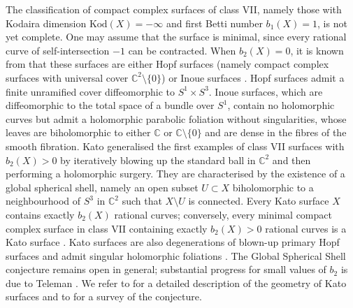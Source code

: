 \documentclass[12pt]{amsart}
\numberwithin{equation}{section}
\theoremstyle{remark}
\theoremstyle{definition}
\begin{document}
The classification of compact complex surfaces of class VII, namely those with Kodaira dimension $\mathrm{Kod}(X)=-\infty$ and first Betti number $b_1(X)=1$, is not yet complete.
One may assume that the surface is minimal, since every rational curve of self-intersection $-1$ can be contracted.
When $b_2(X)=0$, it is known from \cite{bogomolov-1976, bogomolov, li-yau-zheng0, li-yau-zheng, teleman} that these surfaces are either Hopf surfaces (namely compact complex surfaces with universal cover $\mathbb C^2\setminus \{0\}$) or Inoue surfaces \cite{inoue, bombieri}. Hopf surfaces admit a finite unramified cover diffeomorphic to $S^1\times S^3$.
Inoue surfaces, which are diffeomorphic to the total space of a bundle over $S^1$, contain no holomorphic curves but admit a holomorphic parabolic foliation without singularities, whose leaves are biholomorphic to either $\mathbb C$ or $\mathbb C\setminus\{0\}$ and are dense in the fibres of the smooth fibration.
Kato \cite{kato} generalised the first examples \cite{inoue-2, inoue-3} of class VII surfaces with $b_2(X)>0$ by iteratively blowing up the standard ball in $\mathbb C^2$ and then performing a holomorphic surgery.
They are characterised by the existence of a global spherical shell, namely an open subset $U \subset X$ biholomorphic to a neighbourhood of $S^3$ in $\mathbb C^2$ such that $X\setminus U$ is connected. Every Kato surface $X$ contains exactly $b_2(X)$ rational curves; conversely, every minimal compact complex surface in class VII containing exactly $b_2(X)>0$ rational curves is a Kato surface \cite{dloussky-oeljeklaus-toma}.
Kato surfaces are also degenerations of blown-up primary Hopf surfaces \cite{nakamura} and admit singular holomorphic foliations \cite{DO}.
The Global Spherical Shell conjecture remains open in general; substantial progress for small values of $b_2$ is due to Teleman \cite{teleman-Inv, teleman-Ann, teleman-PSPM, teleman-INdAM}. We refer to \cite{dloussky-Kato} for a detailed description of the geometry of Kato surfaces and to \cite{teleman-LNM} for a survey of the conjecture.
\end{document}
